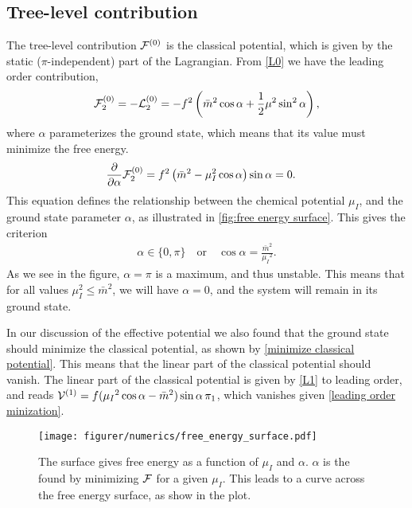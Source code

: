 \subsection*{Tree-level contribution}
The tree-level contribution $\mathcal{F}^{(0)}$ is the classical potential, which is given by the static ($\pi$-independent) part of the Lagrangian.
From \cref{L0} we have the leading order contribution,
\begin{equation}
    \mathcal{F}_2^{(0)}
    = - \mathcal{L}_2^{(0)} 
    = 
    -f^2   
    \left(
        \bar m^2 \cos{\alpha}
        + \frac{1}{2} \mu^2 \sin^2{\alpha}
    \right),
\end{equation}
where $\alpha$ parameterizes the ground state, which means that its value must minimize the free energy.
\begin{align*}
    &\diffp{}{\alpha} \Ef_2^{(0)} 
    = f^2\left(\bar m^2 - \mu_I^2\cos{\alpha}\right)\sin{\alpha}
    = 0.
\end{align*}
This equation defines the relationship between the chemical potential $\mu_I$, and the ground state parameter $\alpha$, as illustrated in \autoref{fig:free energy surface}.
This gives the criterion
\begin{align}
    \label{leading order minization}
    \alpha \in \{0, \pi\} \quad
    \mathrm{or} \quad
    \cos{\alpha} = \frac{\bar m^2}{\mu_I{}^2}.
\end{align}
As we see in the figure, $\alpha = \pi$ is a maximum, and thus unstable.
This means that for all values $\mu_I^2 \leq \bar m^2$, we will have $\alpha = 0$, and the system will remain in its ground state.

In our discussion of the effective potential we also found that the ground state should minimize the classical potential, as shown by \cref{minimize classical potential}.
This means that the linear part of the classical potential should vanish.
The linear part of the classical potential is given by \autoref{L1} to leading order, and reads $\mathcal{V}^{(1)} = f(\mu_I{}^2\cos{\alpha} - \bar m^2)\sin{\alpha} \, \pi_1 $, which vanishes given \cref{leading order minization}.
\begin{figure}[ht]
    \centering
    \texttt{[image: figurer/numerics/free\_energy\_surface.pdf]}
    \caption{The surface gives free energy as a function of $\mu_I$ and $\alpha$. $\alpha$ is the found by minimizing $\mathcal{F}$ for a given $\mu_I$. This leads to a curve across the free energy surface, as show in the plot.}
    \label{fig:free energy surface}
\end{figure}

